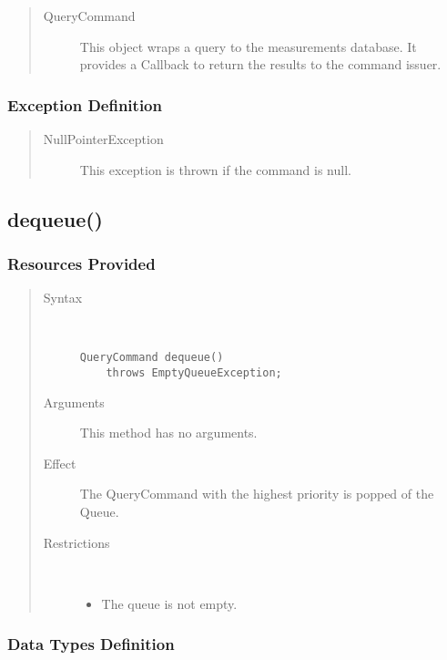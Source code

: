 \begin{quote}
	\begin{description}
		\item[QueryCommand] This object wraps a query to the measurements database. It
		provides a Callback to return the results to the command issuer.
	\end{description} 
\end{quote}

\subsubsection{Exception Definition}

\begin{quote}
	\begin{description}
		\item[NullPointerException] This exception is thrown if the command is null.
	\end{description} 
\end{quote}

\subsection{dequeue()}

\subsubsection{Resources Provided}

\begin{quote}
	\begin{description}
		\item[Syntax] \ 
		\begin{verbatim}
QueryCommand dequeue() 
    throws EmptyQueueException;
		\end{verbatim}
		\item[Arguments] This method has no arguments.
		\item[Effect] The QueryCommand with the highest priority is popped of the
		Queue.
		\item[Restrictions] \ 
		\begin{itemize}
			\item The queue is not empty. 
		\end{itemize}
	\end{description} 
\end{quote}

\subsubsection{Data Types Definition}

